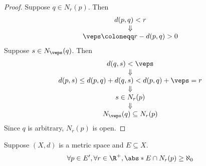 \begin{proof}
  Suppose $q \in N_{r}(p)$. Then
  \[
    \begin{array}{c}
      d(p, q) < r \\
      \Downarrow  \\
      \veps \coloneqq r - d(p, q) > 0
    \end{array}
  \]
  Suppose $s \in N_{\veps}(q)$. Then
  \[
    \begin{array}{c}
      d(q, s) < \veps                                      \\
      \Downarrow                                           \\
      d(p, s) \leq d(p, q) + d(q, s) < d(p, q) + \veps = r \\
      \Downarrow                                           \\
      s \in N_{r}(p)                                       \\
      \Downarrow                                           \\
      N_{\veps}(q) \subseteq N_{r}(p)
    \end{array}
  \]
  Since $q$ is arbitrary, $N_{r}(p)$ is open.
\end{proof}

\bigskip

\begin{theorem} \label{an:thm:limit-point-neighborhood-contains-infinite-elements}
  Suppose $(X, d)$ is a metric space and $E \subseteq X$.
  \[
    \forall p \in E', \forall r \in \R^{+}, \abs*{E \cap N_{r}(p)} \geq \aleph_{0}
  \]
\end{theorem}
